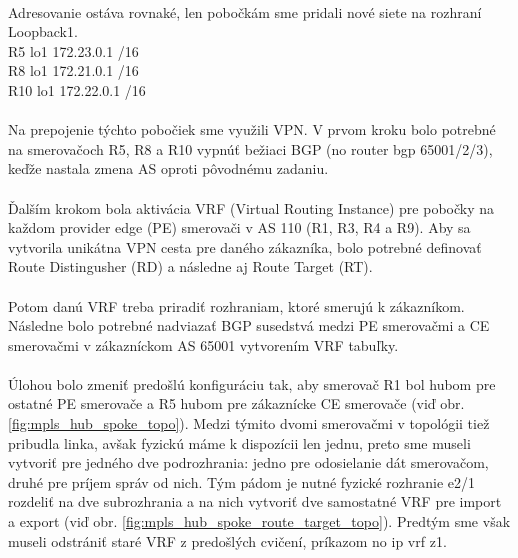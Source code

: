 \documentclass[12pt,twoside,a4paper]{report}
\newcommand\tab[1][1cm]{\hspace*{#1}}
\begin{document}
\paragraph{}
Adresovanie ostáva rovnaké, len pobočkám sme pridali nové siete na rozhraní Loopback1.\\
\tab[2cm]R5 \tab[2cm] lo1\tab[2cm] 172.23.0.1 /16\\
\tab[2cm]R8 \tab[2cm] lo1\tab[2cm] 172.21.0.1 /16\\
\tab[2cm]R10 \tab[1.8cm] lo1\tab[2cm] 172.22.0.1 /16

\paragraph{}
Na prepojenie týchto pobočiek sme využili VPN. V prvom kroku bolo potrebné na smerovačoch R5, R8 a R10 vypnúť bežiaci BGP (no router bgp 65001/2/3), keďže nastala zmena AS oproti pôvodnému zadaniu.

\paragraph{}
Ďalším krokom bola aktivácia VRF (Virtual Routing Instance) pre pobočky na každom provider edge (PE) smerovači v AS 110 (R1, R3, R4 a R9). Aby sa vytvorila unikátna VPN cesta pre daného zákazníka, bolo potrebné definovať Route Distingusher (RD) a následne aj Route Target (RT).

\paragraph{}
Potom danú VRF treba priradiť rozhraniam, ktoré smerujú k zákazníkom. Následne bolo potrebné nadviazať BGP susedstvá medzi PE smerovačmi a CE smerovačmi v zákazníckom AS 65001 vytvorením VRF tabuľky.

\paragraph{}
Úlohou bolo zmeniť predošlú konfiguráciu tak, aby smerovač R1 bol hubom pre ostatné PE smerovače a R5 hubom pre zákaznícke CE smerovače (viď obr. \ref{fig:mpls_hub_spoke_topo}). Medzi týmito dvomi smerovačmi v topológii tiež pribudla linka, avšak fyzickú máme k dispozícii len jednu, preto sme museli vytvoriť pre jedného dve podrozhrania: jedno pre odosielanie dát  smerovačom, druhé pre príjem správ od nich. Tým pádom je nutné fyzické rozhranie e2/1 rozdeliť na dve subrozhrania a na nich vytvoriť dve samostatné VRF pre import a export (viď obr. \ref{fig:mpls_hub_spoke_route_target_topo}). Predtým sme však museli odstrániť staré VRF z predošlých cvičení, príkazom no ip vrf z1.
\end{document}
